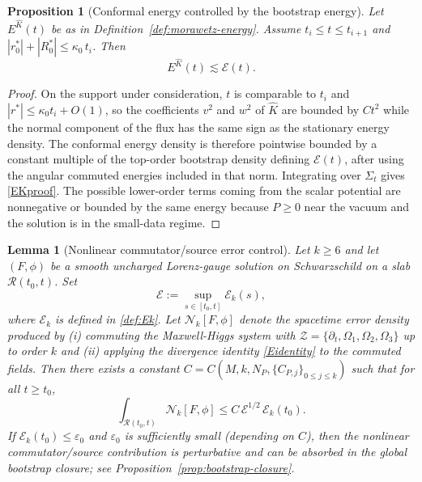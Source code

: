 \documentclass[11pt]{article}
\numberwithin{equation}{section}
\theoremstyle{plain}
\newtheorem{proposition}[theorem]{Proposition}
\newtheorem{lemma}[theorem]{Lemma}
\theoremstyle{definition}
\theoremstyle{remark}
\begin{document}
\begin{proposition}[Conformal energy controlled by the bootstrap energy]\label{prep3}
		Let $E^{\hat K}(t)$ be as in Definition~\ref{def:morawetz-energy}.
		Assume $t_i\le t\le t_{i+1}$ and $|r_0^{\ast}|+|R_0^{\ast}|\le \kappa_0\,t_i$.
		Then
	\begin{equation}\label{EKproof}
			E^{\hat K}(t)\lesssim\mathcal{E}(t).
	\end{equation}
\end{proposition}
\begin{proof}
On the support under consideration, $t$ is comparable to $t_i$ and $|r^*|\le\kappa_0t_i+O(1)$, so the coefficients $v^2$ and $w^2$ of $\hat K$ are bounded by $Ct^2$ while the normal component of the flux has the same sign as the stationary energy density.  The conformal energy density is therefore pointwise bounded by a constant multiple of the top-order bootstrap density defining $\mathcal E(t)$, after using the angular commuted energies included in that norm.  Integrating over $\Sigma_t$ gives \eqref{EKproof}.  The possible lower-order terms coming from the scalar potential are nonnegative or bounded by the same energy because $P\ge0$ near the vacuum and the solution is in the small-data regime.
\end{proof}


\begin{lemma}[Nonlinear commutator/source error control]\label{lem:nonlinear-error-control}
Let $k\ge 6$ and let $(F,\phi)$ be a smooth uncharged Lorenz-gauge solution on Schwarzschild on a slab $\mathcal R(t_{0},t)$.
Set
\begin{equation}
\mathcal E:=\sup_{s\in[t_{0},t]}\mathcal E_{k}(s),
\end{equation}
where $\mathcal E_{k}$ is defined in \eqref{def:Ek}.
Let $\mathcal N_{k}[F,\phi]$ denote the spacetime error density produced by (i) commuting the Maxwell-Higgs system with $\mathcal Z=\{\partial_{t},\Omega_{1},\Omega_{2},\Omega_{3}\}$ up to order $k$ and (ii) applying the divergence identity \eqref{Eidentity} to the commuted fields.
Then there exists a constant $C=C(M,k,N_{P},\{C_{P,j}\}_{0\le j\le k})$ such that for all $t\ge t_{0}$,
\begin{equation}\label{eq:nonlinear-error-control}
\int_{\mathcal R(t_{0},t)} \mathcal N_{k}[F,\phi]
\le
C\,\mathcal E^{1/2}\,\mathcal E_{k}(t_{0}).
\end{equation}
If $\mathcal E_{k}(t_{0})\le \varepsilon_{0}$ and $\varepsilon_{0}$ is sufficiently small (depending on $C$), then the nonlinear commutator/source contribution is perturbative and can be absorbed in the global bootstrap closure; see Proposition~\ref{prop:bootstrap-closure}.
\end{lemma}
\end{document}
